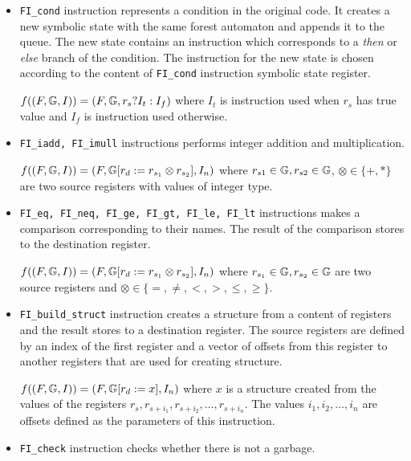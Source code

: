 	\begin{itemize}

	\item {\tt FI\_cond} instruction represents a condition in the original code.
		It creates a new symbolic state with the same forest automaton and appends
		it to the queue.
		The new state contains an instruction which corresponds to a \textit{then}
		or \textit{else} branch of the condition.
		The instruction for the new state is chosen according to
		the content of {\tt FI\_cond} instruction symbolic state register.
		
		$f((F, \mathbb{G}, I)) = (F, \mathbb{G}, r_s ? I_t : I_f)$
		where $I_t$ is instruction used when $r_s$ has true value and
		$I_f$ is instruction used otherwise.


	\item {\tt FI\_iadd, FI\_imull} instructions performs integer
		addition and multiplication.
		
		$f((F, \mathbb{G}, I)) = (F, \mathbb{G} [r_d := r_{s_1} \otimes r_{s_2}], I_n)$
		where $r_{s1} \in \mathbb{G}, r_{s2} \in \mathbb{G}$, $\otimes \in \{+,*\}$
		are two source registers with values of integer type.

	\item {\tt FI\_eq, FI\_neq, FI\_ge, FI\_gt, FI\_le, FI\_lt} instructions
		makes a comparison corresponding to their names.
		The result of the comparison stores to the destination register.
		
		$f((F, \mathbb{G}, I)) = (F, \mathbb{G} [r_d := r_{s_1} \otimes r_{s_2}], I_n)$
		where $r_{s_1} \in \mathbb{G}, r_{s_2} \in \mathbb{G}$ are two source registers
		and $\otimes \in \{=,\neq, <,>,\leq,\geq\}$.
	
	\item {\tt FI\_build\_struct} instruction creates a structure from a
		content of registers and the result stores to a destination register.
		The source registers are defined by an index of the first register and
		a vector of offsets from this register to another registers
		that are used for creating structure.
		
		$f((F, \mathbb{G}, I)) = (F, \mathbb{G} [r_d := x], I_n)$
		where $x$ is a structure created from the values of the registers $r_s,r_{s+i_1},r_{s+i_2}, \ldots, r_{s+i_n}$.
		The values $i_1, i_2, \ldots, i_n$ are offsets defined as the parameters of this instruction.

	\item {\tt FI\_check} instruction checks whether there is not a garbage.
		

\end{itemize}
